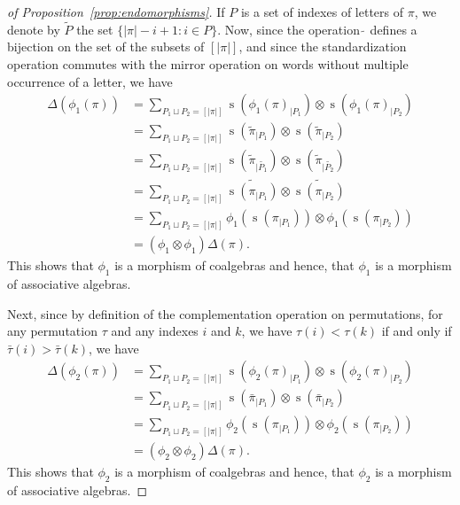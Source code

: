 \documentclass[a4paper]{llncs}
\DeclareMathOperator{\STD}{\mathrm{s}}
\begin{document}
\begin{proof}[of Proposition~\ref{prop:endomorphisms}]
    If $P$ is a set of indexes of letters of $\pi$, we denote by
    $\widetilde{P}$ the set $\{|\pi| - i  + 1 : i \in P\}$. Now, since
    the operation $\widetilde{\,}$ defines a bijection on the set of the
    subsets of $[|\pi|]$, and since the standardization operation
    commutes with the mirror operation on words without multiple
    occurrence of a letter, we have
    \begin{equation} \begin{split}
        \Delta(\phi_1(\pi))
        & = \sum_{P_1 \sqcup P_2 = [|\pi|]}
        \STD\left(\phi_1(\pi)_{|P_1}\right)
        \otimes \STD\left(\phi_1(\pi)_{|P_2}\right) \\
        & = \sum_{P_1 \sqcup P_2 = [|\pi|]}
        \STD\left(\widetilde{\pi}_{|P_1}\right)
        \otimes \STD\left(\widetilde{\pi}_{|P_2}\right) \\
        & = \sum_{P_1 \sqcup P_2 = [|\pi|]}
        \STD\left(\widetilde{\pi}_{|\widetilde{P_1}}\right)
        \otimes \STD\left(\widetilde{\pi}_{|\widetilde{P_2}}\right) \\
        & = \sum_{P_1 \sqcup P_2 = [|\pi|]}
        \widetilde{\STD\left(\pi_{|P_1}\right)}
        \otimes \widetilde{\STD\left(\pi_{|P_2}\right)} \\
        & = \sum_{P_1 \sqcup P_2 = [|\pi|]}
        \phi_1\left(\STD\left(\pi_{|P_1}\right)\right)
        \otimes \phi_1\left(\STD\left(\pi_{|P_2}\right)\right) \\
        & = (\phi_1 \otimes \phi_1) \Delta(\pi).
    \end{split} \end{equation}
    This shows that $\phi_1$ is a morphism of coalgebras and hence, that
    $\phi_1$ is a morphism of associative algebras.
    \smallskip

    Next, since by definition of the complementation operation on
    permutations, for any permutation $\tau$ and any indexes $i$ and $k$,
    we have $\tau(i) < \tau(k)$ if and only if $\bar \tau(i) > \bar \tau(k)$,
    we have
    \begin{equation} \begin{split}
        \Delta(\phi_2(\pi))
        & = \sum_{P_1 \sqcup P_2 = [|\pi|]}
        \STD\left(\phi_2(\pi)_{|P_1}\right)
        \otimes \STD\left(\phi_2(\pi)_{|P_2}\right) \\
        & = \sum_{P_1 \sqcup P_2 = [|\pi|]}
        \STD\left(\bar \pi_{|P_1}\right)
        \otimes \STD\left(\bar \pi_{|P_2}\right) \\
        & = \sum_{P_1 \sqcup P_2 = [|\pi|]}
        \phi_2\left(\STD\left(\pi_{|P_1}\right)\right)
        \otimes \phi_2\left(\STD\left(\pi_{|P_2}\right)\right) \\
        & = (\phi_2 \otimes \phi_2) \Delta(\pi).
    \end{split} \end{equation}
    This shows that $\phi_2$ is a morphism of coalgebras and hence, that
    $\phi_2$ is a morphism of associative algebras.
    \smallskip


\end{proof}
\end{document}
